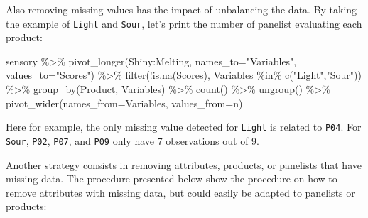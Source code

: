 \documentclass[
]{book}
\newenvironment{Shaded}{\begin{snugshade}}{\end{snugshade}}
\newcommand{\AttributeTok}[1]{\textcolor[rgb]{0.77,0.63,0.00}{#1}}
\newcommand{\FunctionTok}[1]{\textcolor[rgb]{0.00,0.00,0.00}{#1}}
\newcommand{\NormalTok}[1]{#1}
\newcommand{\SpecialCharTok}[1]{\textcolor[rgb]{0.00,0.00,0.00}{#1}}
\newcommand{\StringTok}[1]{\textcolor[rgb]{0.31,0.60,0.02}{#1}}
\begin{document}
Also removing missing values has the impact of unbalancing the data. By taking the example of \texttt{Light} and \texttt{Sour}, let's print the number of panelist evaluating each product:

\begin{Shaded}
\begin{Highlighting}[]
\NormalTok{sensory }\SpecialCharTok{\%\textgreater{}\%} 
  \FunctionTok{pivot\_longer}\NormalTok{(Shiny}\SpecialCharTok{:}\NormalTok{Melting, }\AttributeTok{names\_to=}\StringTok{"Variables"}\NormalTok{, }\AttributeTok{values\_to=}\StringTok{"Scores"}\NormalTok{) }\SpecialCharTok{\%\textgreater{}\%} 
  \FunctionTok{filter}\NormalTok{(}\SpecialCharTok{!}\FunctionTok{is.na}\NormalTok{(Scores),}
\NormalTok{         Variables }\SpecialCharTok{\%in\%} \FunctionTok{c}\NormalTok{(}\StringTok{"Light"}\NormalTok{,}\StringTok{"Sour"}\NormalTok{)) }\SpecialCharTok{\%\textgreater{}\%}
  \FunctionTok{group\_by}\NormalTok{(Product, Variables) }\SpecialCharTok{\%\textgreater{}\%} 
  \FunctionTok{count}\NormalTok{() }\SpecialCharTok{\%\textgreater{}\%} 
  \FunctionTok{ungroup}\NormalTok{() }\SpecialCharTok{\%\textgreater{}\%} 
  \FunctionTok{pivot\_wider}\NormalTok{(}\AttributeTok{names\_from=}\NormalTok{Variables, }\AttributeTok{values\_from=}\NormalTok{n)}
\end{Highlighting}
\end{Shaded}

Here for example, the only missing value detected for \texttt{Light} is related to \texttt{P04}. For \texttt{Sour}, \texttt{P02}, \texttt{P07}, and \texttt{P09} only have 7 observations out of 9.

Another strategy consists in removing attributes, products, or panelists that have missing data. The procedure presented below show the procedure on how to remove attributes with missing data, but could easily be adapted to panelists or products:
\end{document}
